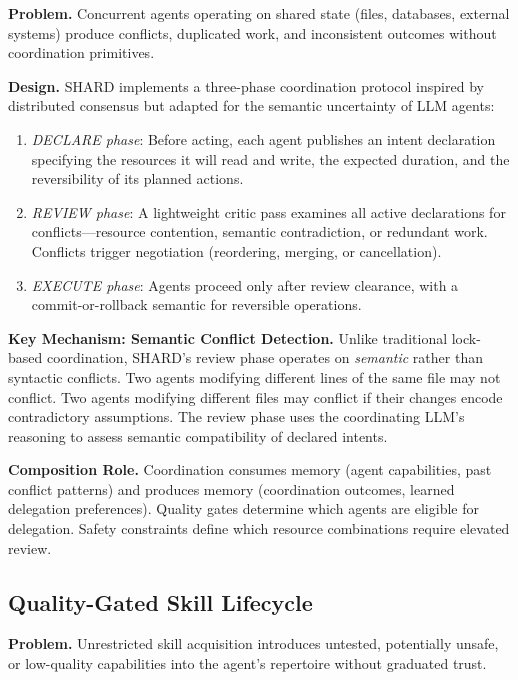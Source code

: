 \documentclass[11pt]{article}
\begin{document}
\textbf{Problem.} Concurrent agents operating on shared state (files, databases, external systems) produce conflicts, duplicated work, and inconsistent outcomes without coordination primitives.

\textbf{Design.} SHARD implements a three-phase coordination protocol inspired by distributed consensus but adapted for the semantic uncertainty of LLM agents:

\begin{enumerate}[nosep]
\item \emph{DECLARE phase}: Before acting, each agent publishes an intent declaration specifying the resources it will read and write, the expected duration, and the reversibility of its planned actions.
\item \emph{REVIEW phase}: A lightweight critic pass examines all active declarations for conflicts---resource contention, semantic contradiction, or redundant work. Conflicts trigger negotiation (reordering, merging, or cancellation).
\item \emph{EXECUTE phase}: Agents proceed only after review clearance, with a commit-or-rollback semantic for reversible operations.
\end{enumerate}

\textbf{Key Mechanism: Semantic Conflict Detection.} Unlike traditional lock-based coordination, SHARD's review phase operates on \emph{semantic} rather than syntactic conflicts. Two agents modifying different lines of the same file may not conflict. Two agents modifying different files may conflict if their changes encode contradictory assumptions. The review phase uses the coordinating LLM's reasoning to assess semantic compatibility of declared intents.

\textbf{Composition Role.} Coordination consumes memory (agent capabilities, past conflict patterns) and produces memory (coordination outcomes, learned delegation preferences). Quality gates determine which agents are eligible for delegation. Safety constraints define which resource combinations require elevated review.

\subsection{Quality-Gated Skill Lifecycle}

\textbf{Problem.} Unrestricted skill acquisition introduces untested, potentially unsafe, or low-quality capabilities into the agent's repertoire without graduated trust.
\end{document}
